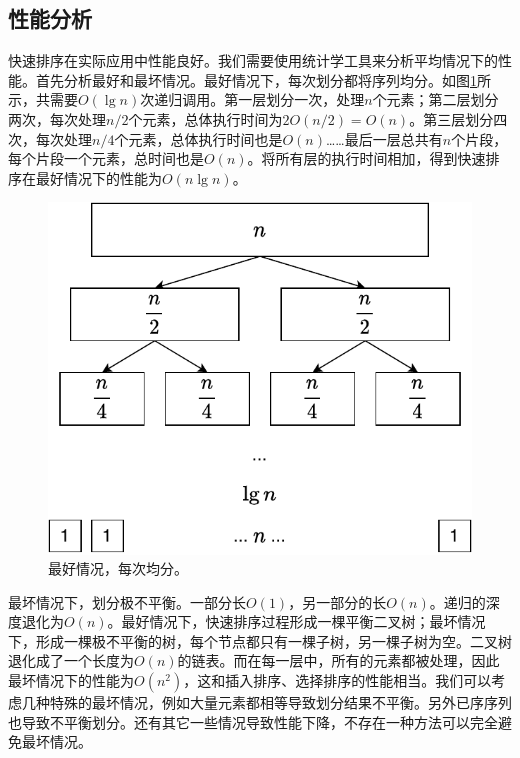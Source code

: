 \documentclass[b5paper]{ctexart}
\begin{document}
\subsection{性能分析}

快速排序在实际应用中性能良好。我们需要使用统计学工具来分析平均情况下的性能。首先分析最好和最坏情况。最好情况下，每次划分都将序列均分。如图\cref{fig:qsort-best}所示，共需要$O(\lg n)$次递归调用。第一层划分一次，处理$n$个元素；第二层划分两次，每次处理$n/2$个元素，总体执行时间为$2 O(n/2) = O(n)$。第三层划分四次，每次处理$n/4$个元素，总体执行时间也是$O(n)$……最后一层总共有$n$个片段，每个片段一个元素，总时间也是$O(n)$。将所有层的执行时间相加，得到快速排序在最好情况下的性能为$O(n \lg n)$。

\begin{figure}[htbp]
 \centering
 \includegraphics[scale=0.55]{img/qsort-best}
 \caption{最好情况，每次均分。}
 \label{fig:qsort-best}
\end{figure}

最坏情况下，划分极不平衡。一部分长$O(1)$，另一部分的长$O(n)$。递归的深度退化为$O(n)$。最好情况下，快速排序过程形成一棵平衡二叉树；最坏情况下，形成一棵极不平衡的树，每个节点都只有一棵子树，另一棵子树为空。二叉树退化成了一个长度为$O(n)$的链表。而在每一层中，所有的元素都被处理，因此最坏情况下的性能为$O(n^2)$，这和插入排序、选择排序的性能相当。我们可以考虑几种特殊的最坏情况，例如大量元素都相等导致划分结果不平衡。另外已序序列也导致不平衡划分。还有其它一些情况导致性能下降，不存在一种方法可以完全避免最坏情况。
\end{document}
